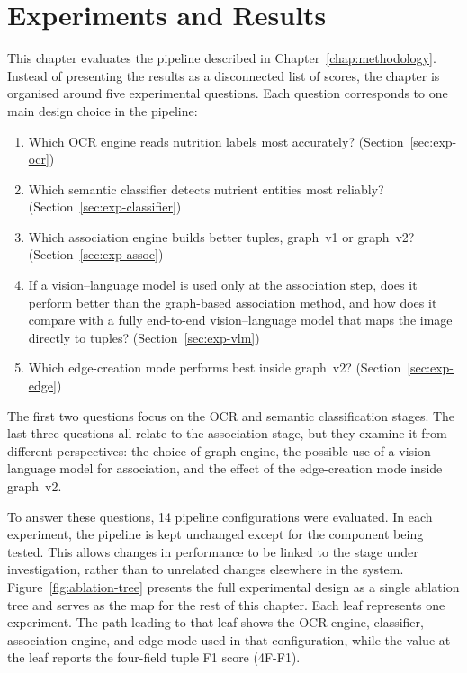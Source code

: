 
\chapter{Experiments and Results}\label{chap:experiments}

This chapter evaluates the pipeline described in Chapter~\ref{chap:methodology}. Instead of presenting the results as a disconnected list of scores, the chapter is organised around five experimental questions. Each question corresponds to one main design choice in the pipeline:

\begin{enumerate}
\item Which OCR engine reads nutrition labels most accurately?
(Section~\ref{sec:exp-ocr})
\item Which semantic classifier detects nutrient entities most reliably?
(Section~\ref{sec:exp-classifier})
\item Which association engine builds better tuples, graph~v1 or
graph~v2? (Section~\ref{sec:exp-assoc})
\item If a vision--language model is used only at the association step,
does it perform better than the graph-based association method, and
how does it compare with a fully end-to-end vision--language model
that maps the image directly to tuples?
(Section~\ref{sec:exp-vlm})
\item Which edge-creation mode performs best inside graph~v2?
(Section~\ref{sec:exp-edge})
\end{enumerate}

The first two questions focus on the OCR and semantic classification stages. The last three questions all relate to the association stage, but they examine it from different perspectives: the choice of graph engine, the possible use of a vision--language model for association, and the effect of the edge-creation mode inside graph~v2.

To answer these questions, 14 pipeline configurations were evaluated. In each experiment, the pipeline is kept unchanged except for the component being tested. This allows changes in performance to be linked to the stage under investigation, rather than to unrelated changes elsewhere in the system. Figure~\ref{fig:ablation-tree} presents the full experimental design as a single ablation tree and serves as the map for the rest of this chapter. Each leaf represents one experiment. The path leading to that leaf shows the OCR engine, classifier, association engine, and edge mode used in that configuration, while the value at the leaf reports the four-field tuple F1 score (4F-F1).

